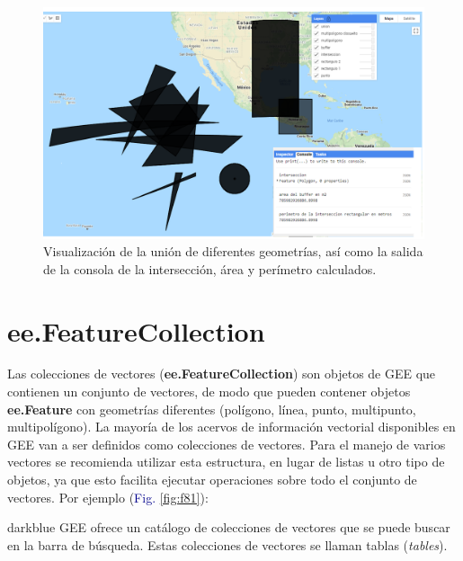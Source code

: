 \documentclass[
  12pt,
  letterpaper,
  twoside]{book}
\newcommand\boldpurple[1]{\textcolor{darkpurple}{\textbf{#1}}}
\begin{document}
\begin{figure}[H]

{\centering \includegraphics[width=0.95\linewidth]{Img/ej12} 

}

\caption{Visualización de la unión de diferentes geometrías, así como la salida de la consola de la intersección, área y perímetro calculados.}\label{fig:f73}
\end{figure}

\newpage

\hypertarget{ee.featurecollection-1}{%
\chapter{ee.FeatureCollection}\label{ee.featurecollection-1}}

Las colecciones de vectores (\boldpurple{ee.FeatureCollection}) son objetos de GEE que contienen un conjunto de vectores, de modo que pueden contener objetos \boldpurple{ee.Feature} con geometrías diferentes (polígono, línea, punto, multipunto, multipolígono). La mayoría de los acervos de información vectorial disponibles en GEE van a ser definidos como colecciones de vectores. Para el manejo de varios vectores se recomienda utilizar esta estructura, en lugar de listas u otro tipo de objetos, ya que esto facilita ejecutar operaciones sobre todo el conjunto de vectores. Por ejemplo (\textcolor{darkblue}{Fig.} \ref{fig:f81}):

\begin{bluebox2}

\begin{awesomeblock}{5pt}{\faLightbulb}{darkblue}
GEE ofrece un catálogo de colecciones de vectores que se puede buscar en la barra de búsqueda. Estas colecciones de vectores se llaman tablas (\emph{tables}).

\end{awesomeblock}

\end{bluebox2}
\end{document}
